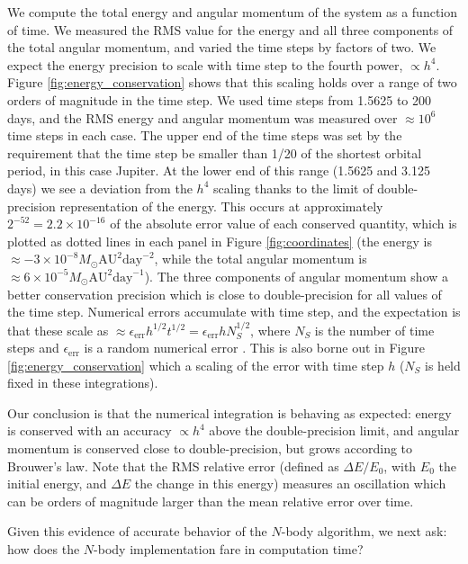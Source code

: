 \documentclass[fleqn,usenatbib,twocolumn]{mnras}
\newcommand   {\change}[1] {{\color{black}{#1}}}
\begin{document}
We compute the total energy and angular momentum
of the system as a function of time.  We measured the RMS value for the energy
and all three components of the total angular momentum, and varied the time
steps by factors of two.  We expect the energy precision to scale with time
step to the fourth power, $\propto h^4$. Figure \ref{fig:energy_conservation} shows that this
scaling holds over a range of two orders of magnitude in the time step.  We used time steps
from 1.5625 to 200 days, and the RMS energy and angular momentum was measured
over $\approx 10^6$ time steps in each case.  The upper end of the time steps was set by
the requirement that the time step be smaller than 1/20 of the shortest orbital
period, in this case Jupiter.  At the lower end of this range (1.5625 and
3.125 days) we see a deviation from the $h^4$ scaling thanks to the limit of
double-precision representation of the energy.  This occurs at approximately
$2^{-52} = 2.2\times 10^{-16}$ of the absolute error value of each conserved quantity, which is plotted
as dotted lines in each panel in Figure \ref{fig:coordinates} (the energy
is $\approx -3\times10^{-8} M_\odot \mathrm{AU}^2 \mathrm{day}^{-2}$, while
the total angular momentum is $\approx 6\times 10^{-5} M_\odot \mathrm{AU}^2
\mathrm{day}^{-1}$).  The three
components of angular momentum show a better conservation precision which
is close to double-precision for all values of the time step.  Numerical errors
accumulate with time step, and the expectation is that these scale as
$\approx \epsilon_\mathrm{err} h^{1/2} t^{1/2} = \epsilon_\mathrm{err} h N_S^{1/2}$, where $N_S$ is the
number of time steps and $\epsilon_\mathrm{err}$ is a random numerical error \citep{Hairer2008}.
This is also borne out in Figure \ref{fig:energy_conservation} which \change{shows} a scaling of
the error with time step $h$ ($N_S$ is held fixed in these integrations).

Our conclusion is that the numerical integration
is behaving as expected:  energy is conserved with an accuracy $\propto h^4$
above the double-precision limit, and angular momentum is conserved close to
double-precision, but grows according to Brouwer's law.   Note that the RMS relative error (defined as $\Delta E/E_0$, with $E_0$ the initial energy, and $\Delta E$ the change in this energy) measures an oscillation which can be orders of magnitude larger than the mean relative error over time.

Given this evidence of accurate behavior of the $N$-body algorithm, we next ask:  how does the $N$-body implementation fare in computation time?
\end{document}
